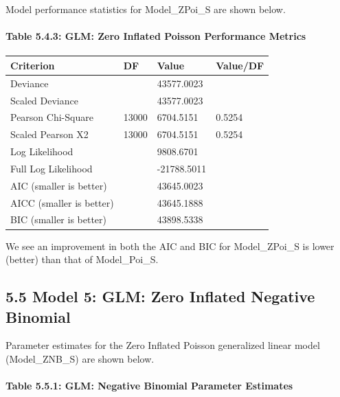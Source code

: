 \documentclass[]{article}
\let\oldparagraph\paragraph
\renewcommand{\paragraph}[1]{\oldparagraph{#1}\mbox{}}
\begin{document}
Model performance statistics for Model\_ZPoi\_S are shown below.

\paragraph{Table 5.4.3: GLM: Zero Inflated Poisson Performance
Metrics}\label{table-5.4.3-glm-zero-inflated-poisson-performance-metrics}

\begin{longtable}[]{@{}llll@{}}
\toprule
Criterion & DF & Value & Value/DF\tabularnewline
\midrule
\endhead
Deviance & & 43577.0023 &\tabularnewline
Scaled Deviance & & 43577.0023 &\tabularnewline
Pearson Chi-Square & 13000 & 6704.5151 & 0.5254\tabularnewline
Scaled Pearson X2 & 13000 & 6704.5151 & 0.5254\tabularnewline
Log Likelihood & & 9808.6701 &\tabularnewline
Full Log Likelihood & & -21788.5011 &\tabularnewline
AIC (smaller is better) & & 43645.0023 &\tabularnewline
AICC (smaller is better) & & 43645.1888 &\tabularnewline
BIC (smaller is better) & & 43898.5338 &\tabularnewline
\bottomrule
\end{longtable}

We see an improvement in both the AIC and BIC for Model\_ZPoi\_S is
lower (better) than that of Model\_Poi\_S.

\subsection{5.5 Model 5: GLM: Zero Inflated Negative
Binomial}\label{model-5-glm-zero-inflated-negative-binomial}

Parameter estimates for the Zero Inflated Poisson generalized linear
model (Model\_ZNB\_S) are shown below.

\paragraph{Table 5.5.1: GLM: Negative Binomial Parameter
Estimates}\label{table-5.5.1-glm-negative-binomial-parameter-estimates}
\end{document}
